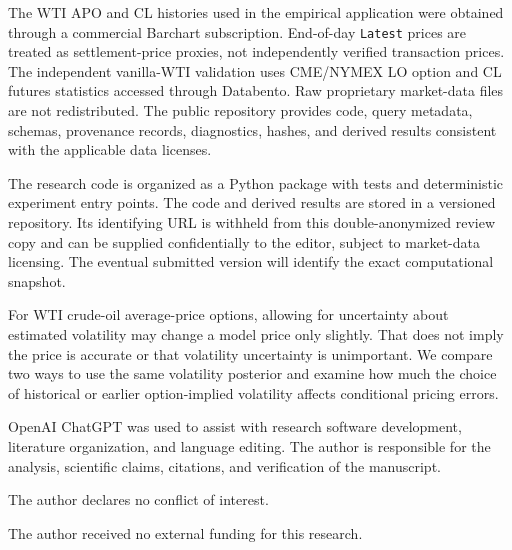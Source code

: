 \documentclass[HARVARD,Utopia2COL]{WileyNJDv5}
\begin{document}







The WTI APO and CL histories used in the empirical application were obtained through a commercial Barchart subscription. End-of-day \texttt{Latest} prices are treated as settlement-price proxies, not independently verified transaction prices. The independent vanilla-WTI validation uses CME/NYMEX LO option and CL futures statistics accessed through Databento. Raw proprietary market-data files are not redistributed. The public repository provides code, query metadata, schemas, provenance records, diagnostics, hashes, and derived results consistent with the applicable data licenses.

The research code is organized as a Python package with tests and deterministic experiment entry points. The code and derived results are stored in a versioned repository. Its identifying URL is withheld from this double-anonymized review copy and can be supplied confidentially to the editor, subject to market-data licensing. The eventual submitted version will identify the exact computational snapshot.

For WTI crude-oil average-price options, allowing for uncertainty about estimated volatility may change a model price only slightly. That does not imply the price is accurate or that volatility uncertainty is unimportant. We compare two ways to use the same volatility posterior and examine how much the choice of historical or earlier option-implied volatility affects conditional pricing errors.

OpenAI ChatGPT was used to assist with research software development, literature organization, and language editing. The author is responsible for the analysis, scientific claims, citations, and verification of the manuscript.

The author declares no conflict of interest.

The author received no external funding for this research.


\end{document}

